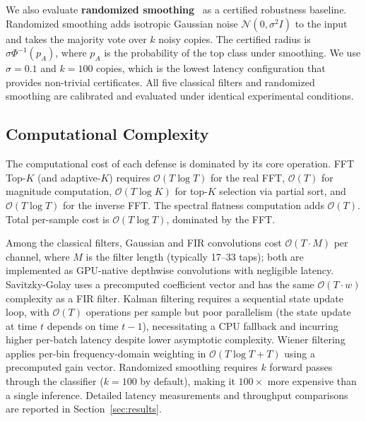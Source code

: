 We also evaluate \textbf{randomized smoothing}~\cite{cohen2019certified} as a
certified robustness baseline. Randomized smoothing adds isotropic Gaussian
noise $\mathcal{N}(0, \sigma^2 I)$ to the input and takes the majority vote
over $k$ noisy copies. The certified radius is $\sigma \Phi^{-1}(p_A)$, where
$p_A$ is the probability of the top class under smoothing. We use $\sigma = 0.1$
and $k = 100$ copies, which is the lowest latency configuration that provides
non-trivial certificates. All five classical filters and randomized smoothing
are calibrated and evaluated under identical experimental conditions.

\subsection{Computational Complexity}
\label{sec:complexity}

The computational cost of each defense is dominated by its core operation.
FFT Top-$K$ (and adaptive-$K$) requires $\mathcal{O}(T \log T)$ for the real
FFT, $\mathcal{O}(T)$ for magnitude computation, $\mathcal{O}(T \log K)$ for
top-$K$ selection via partial sort, and $\mathcal{O}(T \log T)$ for the inverse
FFT. The spectral flatness computation adds $\mathcal{O}(T)$. Total per-sample
cost is $\mathcal{O}(T \log T)$, dominated by the FFT.

Among the classical filters, Gaussian and FIR convolutions cost
$\mathcal{O}(T \cdot M)$ per channel, where $M$ is the filter length (typically
17--33 taps); both are implemented as GPU-native depthwise convolutions with
negligible latency. Savitzky-Golay uses a precomputed coefficient vector and has
the same $\mathcal{O}(T \cdot w)$ complexity as a FIR filter. Kalman filtering
requires a sequential state update loop, with $\mathcal{O}(T)$ operations per
sample but poor parallelism (the state update at time $t$ depends on time $t-1$),
necessitating a CPU fallback and incurring higher per-batch latency despite lower
asymptotic complexity. Wiener filtering applies per-bin frequency-domain
weighting in $\mathcal{O}(T \log T + T)$ using a precomputed gain vector.
Randomized smoothing requires $k$ forward passes through the classifier ($k=100$
by default), making it $100\times$ more expensive than a single inference.
Detailed latency measurements and throughput comparisons are reported in
Section~\ref{sec:results}.
